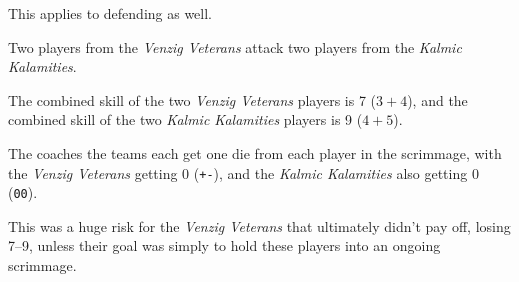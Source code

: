 This applies to defending as well.

\begin{example}
    Two players from the \textit{Venzig Veterans} attack two players from the \textit{Kalmic Kalamities}.

    The combined \fight{} skill of the two \textit{Venzig Veterans} players is 7 ($3 + 4$), and the combined \flight{} skill of the two \textit{Kalmic Kalamities} players is 9 ($4 + 5$).
    
    The coaches the teams each get one \fate{} die from each player in the scrimmage, with the \textit{Venzig Veterans} getting 0 (\texttt{+-}), and the \textit{Kalmic Kalamities} also getting 0 (\texttt{00}).

    This was a huge risk for the \textit{Venzig Veterans} that ultimately didn't pay off, losing 7--9, unless their goal was simply to hold these players into an ongoing scrimmage.
\end{example}

